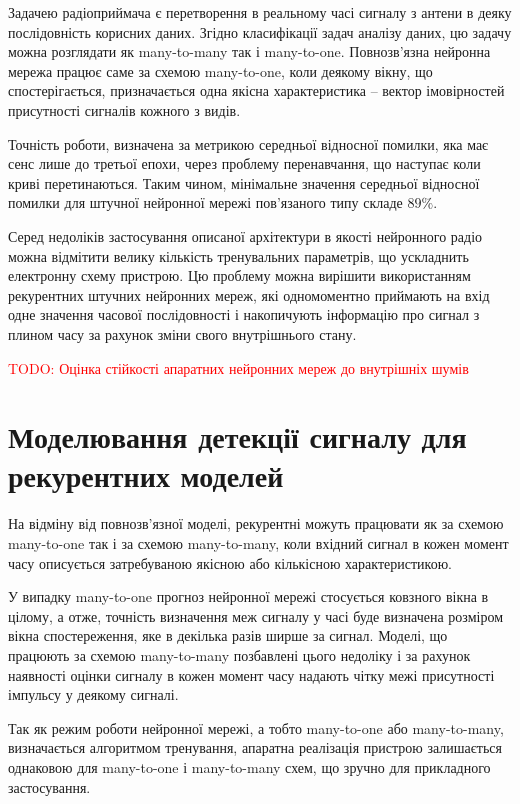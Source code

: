 Задачею радіоприймача є перетворення в реальному часі сигналу з антени в 
деяку послідовність корисних даних. Згідно класифікації задач аналізу даних, 
цю задачу можна розглядати як many-to-many так і many-to-one. Повнозв'язна 
нейронна мережа працює саме за схемою many-to-one, коли деякому вікну, що 
спостерігається, призначається одна якісна характеристика -- вектор 
імовірностей присутності сигналів кожного з видів.

Точність роботи, визначена за метрикою середньої відносної помилки, яка
має сенс лише до третьої епохи, через проблему перенавчання, що наступає 
коли криві перетинаються. Таким чином, мінімальне значення середньої 
відносної помилки для штучної нейронної мережі пов'язаного типу складе 
$ 89 \% $.

Серед недоліків застосування описаної архітектури в якості нейронного радіо
можна відмітити велику кількість тренувальних параметрів, що ускладнить 
електронну схему пристрою. Цю проблему можна вирішити використанням 
рекурентних штучних нейронних мереж, які одномоментно приймають на вхід 
одне значення часової послідовності і накопичують інформацію про сигнал 
з плином часу за рахунок зміни свого внутрішнього стану.

\textcolor{red}{TODO: Оцінка стійкості апаратних нейронних мереж до 
внутрішніх шумів}

\section{Моделювання детекції сигналу для рекурентних моделей}

На відміну від повнозв'язної моделі, рекурентні можуть працювати як за схемою
many-to-one так і за схемою many-to-many, коли вхідний сигнал в кожен момент 
часу описується затребуваною якісною або кількісною характеристикою.

У випадку many-to-one прогноз нейронної мережі стосується ковзного 
вікна в цілому, а отже, точність визначення меж сигналу у часі буде визначена 
розміром вікна спостереження, яке в декілька разів ширше за сигнал. Моделі, 
що працюють за схемою many-to-many позбавлені цього недоліку і за рахунок 
наявності оцінки сигналу в кожен момент часу надають чітку межі присутності
імпульсу у деякому сигналі. 

Так як режим роботи нейронної мережі, а тобто many-to-one або many-to-many,
визначається алгоритмом тренування, апаратна реалізація пристрою залишається 
однаковою для many-to-one і many-to-many схем, що зручно для прикладного 
застосування.

